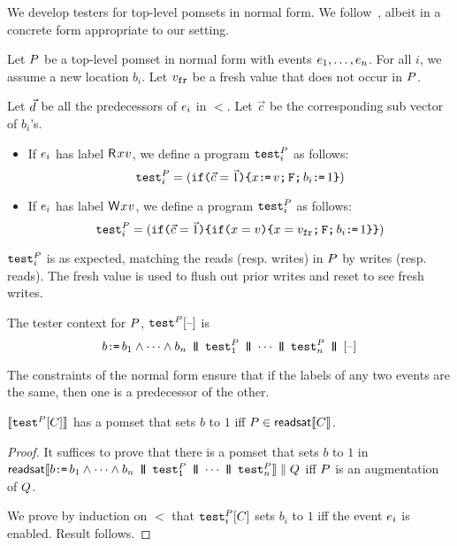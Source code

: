 We develop testers for top-level pomsets in normal form.  We  follow~\citet{Plotkin:1997:TSP:266557.266600}, albeit in a concrete form appropriate to our setting.   

Let $P$ be a top-level pomset in normal form with events $e_1, \ldots,
e_n$.  For all $i$, we assume a new location $b_i$.    Let $v_{{\tt fr}}$ be a fresh value that does not occur in $P$.  

Let $\vec{d}$ be all  the predecessors of $e_i$ in $\lt$. Let $\vec{c}$ be the corresponding sub vector of $b_i$'s. 
\begin{itemize}
\item 
If $e_i$ has label $\DR{\aLoc}{\aVal}$, we define a program ${\tt test}^{P}_{i}$ as follows:  
\[
  {\tt test}^{P}_{i} = (
  \texttt{if}\allowbreak\texttt{(}\vec{c}=\vec{1}\texttt{)} \allowbreak\texttt{\{} x \texttt{:}\mkern-1mu\texttt{=}\, v \texttt{;}\,\allowbreak  \texttt{F} \texttt{;}\,\allowbreak b_i \texttt{:}\mkern-1mu\texttt{=}\, 1 \texttt{\}})
\]
\item 
If $e_i$ has label $\DW{\aLoc}{\aVal}$, we define a program ${\tt test}^{P}_{i}$ as follows:
\[
  \testP{\aPS}{i} = (
  \IF{\vec{c}=\vec{1}} \THEN %
  \IF{\aLoc = \aVal} \THEN \aLoc = \freshaval \SEMI \FENCE \SEMI b_i \GETS 1  \FI \FI)
\]
\end{itemize}
${\tt test}^{P}_{i}$ is as expected, matching the reads (resp. writes) in $P$ by writes (resp. reads).  The fresh value is used to flush out prior writes and reset to see fresh writes.    

\begin{definition}\label{testAPS} 
The tester context for $P$, $\testP{\aPS}{}\hole{}$ is 
\[
b \GETS b_{1} \land  \cdots \land b_{n}
\PAR  \testP{\aPS}{1} 
\PAR   \cdots 
\PAR  \testP{\aPS}{n} 
\PAR \hole{}
\]
\end{definition}
The constraints of the normal form ensure that if the labels of any two events are the same, then one is a predecessor of the other. 

\begin{lemma}\label{tester}
$\sem{\testP{\aPS}{}\hole{\aCmd}}$  has a pomset that sets $b$ to $1$ iff $P \in \mathsf{readsat}\llbracket C\rrbracket$.
\begin{proof}
It suffices to prove that there is a pomset that sets $b$ to $1$ in
 $\mathsf{readsat}\llbracket b \texttt{:}\mkern-1mu\texttt{=}\, b_{1} \land  \cdots \land b_{n}
\,\mathbin{\texttt{\textbf{|}}\mkern-6mu\texttt{\textbf{|}}}\,  {\tt test}^{P}_{1} 
\,\mathbin{\texttt{\textbf{|}}\mkern-6mu\texttt{\textbf{|}}}\,   \cdots 
\,\mathbin{\texttt{\textbf{|}}\mkern-6mu\texttt{\textbf{|}}}\,  {\tt test}^{P}_{n}\rrbracket \parallel Q$ iff $P$ is an augmentation of $Q$. 

We prove by induction on $\lt$ that $\testP{\aPS}{i}\hole{\aCmd}$  sets $b_i$ to $1$ iff the event $e_i$ is enabled. Result follows.
\end{proof}
\end{lemma}

